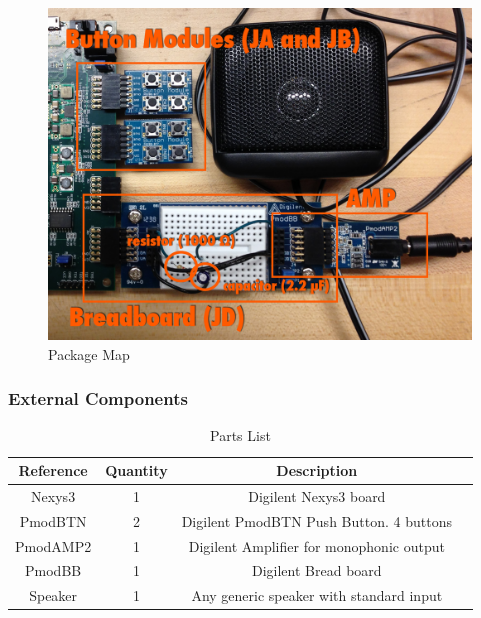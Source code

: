 \documentclass{article}
\begin{document}
      \begin{figure}[H]
        \centering
        \includegraphics[width=6.5in]{img/packagemap.jpg}
        \caption{Package Map}
      \end{figure}

    \subsubsection{External Components}

		\begin{table}[H]
	  	\caption{Parts List}
	    \centering
	    \begin{tabular}{c c c c}
	    \hline\hline
	    Reference & Quantity & Description \\ [0.5ex] %
	    \hline
	    Nexys3 & 1 & Digilent Nexys3 board \\
	    PmodBTN & 2 & Digilent PmodBTN Push Button. 4 buttons \\
	    PmodAMP2 & 1 & Digilent Amplifier for monophonic output \\
	    PmodBB & 1 & Digilent Bread board \\
	    Speaker & 1 & Any generic speaker with standard input \\
	    \hline
	    \end{tabular}
	    \end{table}
\end{document}
